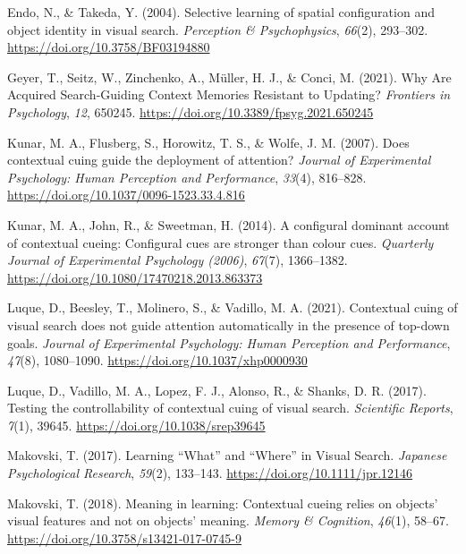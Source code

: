 \documentclass[
  man,
  floatsintext,
  longtable,
  nolmodern,
  notxfonts,
  notimes,
  colorlinks=true,linkcolor=blue,citecolor=blue,urlcolor=blue]{apa7}
\newlength{\cslhangindent}
\newenvironment{CSLReferences}[2] %
 {\begin{list}{}{%
  \setlength{\itemindent}{0pt}
  \setlength{\leftmargin}{0pt}
  \setlength{\parsep}{0pt}
  \ifodd #1
   \setlength{\leftmargin}{\cslhangindent}
   \setlength{\itemindent}{-1\cslhangindent}
  \fi
  \setlength{\itemsep}{#2\baselineskip}}}
 {\end{list}}
\begin{document}
\begin{CSLReferences}{1}{0}
Endo, N., \& Takeda, Y. (2004). Selective learning of spatial
configuration and object identity in visual search. \emph{Perception \&
Psychophysics}, \emph{66}(2), 293--302.
\url{https://doi.org/10.3758/BF03194880}

Geyer, T., Seitz, W., Zinchenko, A., Müller, H. J., \& Conci, M. (2021).
Why {Are Acquired Search-Guiding Context Memories Resistant} to
{Updating}? \emph{Frontiers in Psychology}, \emph{12}, 650245.
\url{https://doi.org/10.3389/fpsyg.2021.650245}

Kunar, M. A., Flusberg, S., Horowitz, T. S., \& Wolfe, J. M. (2007).
Does contextual cuing guide the deployment of attention? \emph{Journal
of Experimental Psychology: Human Perception and Performance},
\emph{33}(4), 816--828. \url{https://doi.org/10.1037/0096-1523.33.4.816}

Kunar, M. A., John, R., \& Sweetman, H. (2014). A configural dominant
account of contextual cueing: {Configural} cues are stronger than colour
cues. \emph{Quarterly Journal of Experimental Psychology (2006)},
\emph{67}(7), 1366--1382.
\url{https://doi.org/10.1080/17470218.2013.863373}

Luque, D., Beesley, T., Molinero, S., \& Vadillo, M. A. (2021).
Contextual cuing of visual search does not guide attention automatically
in the presence of top-down goals. \emph{Journal of Experimental
Psychology: Human Perception and Performance}, \emph{47}(8), 1080--1090.
\url{https://doi.org/10.1037/xhp0000930}

Luque, D., Vadillo, M. A., Lopez, F. J., Alonso, R., \& Shanks, D. R.
(2017). Testing the controllability of contextual cuing of visual
search. \emph{Scientific Reports}, \emph{7}(1), 39645.
\url{https://doi.org/10.1038/srep39645}

Makovski, T. (2017). Learning {``{What}''} and {``{Where}''} in {Visual
Search}. \emph{Japanese Psychological Research}, \emph{59}(2), 133--143.
\url{https://doi.org/10.1111/jpr.12146}

Makovski, T. (2018). Meaning in learning: {Contextual} cueing relies on
objects' visual features and not on objects' meaning. \emph{Memory \&
Cognition}, \emph{46}(1), 58--67.
\url{https://doi.org/10.3758/s13421-017-0745-9}


\end{CSLReferences}
\end{document}
